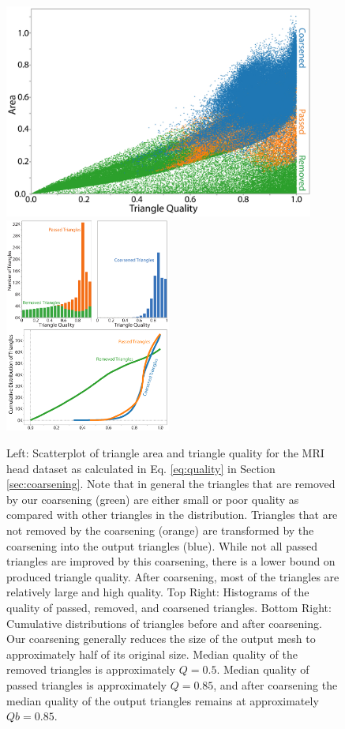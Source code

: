 \documentclass[10pt,journal,cspaper,compsoc]{IEEEtran}
\begin{document}
\begin{figure}[!tb]
\begin{center}
\includegraphics[height=7.05cm]{ScatterAll.png}
\hspace{0.1cm}
\includegraphics[height=7.05cm]{MergedFigures.pdf}
\caption{Left: Scatterplot of triangle area and triangle quality for the MRI head dataset as calculated in Eq. \ref{eq:quality} in Section \ref{sec:coarsening}. Note that in general the triangles that are removed by our coarsening (green) are either small or poor quality as compared with other triangles in the distribution. Triangles that are not removed by the coarsening (orange) are transformed by the coarsening into the output triangles (blue). While not all passed triangles are improved by this coarsening, there is a lower bound on produced triangle quality. After coarsening, most of the triangles are relatively large and high quality.
Top Right: Histograms of the quality of passed, removed, and coarsened triangles.
Bottom Right: Cumulative distributions of triangles before and after coarsening. Our coarsening generally reduces the size of the output mesh to approximately half of its original size. Median quality of the removed triangles is approximately $Q=0.5$. Median quality of passed triangles is approximately $Q=0.85$, and after coarsening the median quality of the output triangles remains at approximately $Qb=0.85$.}
\label{fig:coarseninggraphs}
\end{center}
\end{figure}
\end{document}
